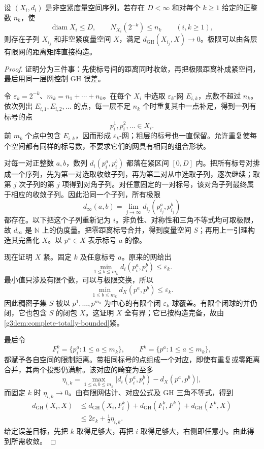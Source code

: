 \begin{proposition}\label{g3:prop:uniform-nets-subsequence}
	设 \((X_i,d_i)\) 是非空紧度量空间序列。若存在 \(D<\infty\) 和对每个 \(k\ge1\) 给定的正整数 \(n_k\)，使
	\[
		\operatorname{diam}X_i\le D,
		\qquad N_{X_i}(2^{-k})\le n_k
		\qquad(i,k\ge1),
	\]
	则存在子列 \(X_{i_j}\) 和非空紧度量空间 \(X\)，满足 \(d_{\mathrm{GH}}(X_{i_j},X)\to0\)。极限可以由各层有限网的距离矩阵直接构造。
\end{proposition}
\begin{proof}
	证明分为三件事：先使标号间的距离同时收敛，再把极限距离补成紧空间，最后用同一层网控制 GH 误差。

	令 \(\varepsilon_k=2^{-k}\)、\(m_k=n_1+\cdots+n_k\)。在每个 \(X_i\) 中选取 \(\varepsilon_k\)-网 \(E_{i,k}\)，点数不超过 \(n_k\)。依次列出 \(E_{i,1},E_{i,2},\ldots\) 的点，每一层不足 \(n_k\) 个时重复其中一点补足，得到一列有标号的点
	\[
		p_i^1,p_i^2,\ldots\in X_i.
	\]
	前 \(m_k\) 个点中包含 \(E_{i,k}\)，因而形成 \(\varepsilon_k\)-网；粗层的标号也一直保留。允许重复使每个空间都有同样的标号数，不要求它们的网具有相同的组合形状。

	对每一对正整数 \(a,b\)，数列 \(d_i(p_i^a,p_i^b)\) 都落在紧区间 \([0,D]\) 内。把所有标号对排成一个序列，先为第一对选取收敛子列，再为第二对从中选取子列，逐次继续；取第 \(j\) 次子列的第 \(j\) 项得到对角子列。对任意固定的一对标号，该对角子列最终属于相应的收敛子列。因此沿同一个子列，所有极限
	\[
		d_\infty(a,b)=\lim_{j\to\infty}
		 d_{i_j}(p_{i_j}^a,p_{i_j}^b)
	\]
	都存在。以下把这个子列重新记为 \(i\)。非负性、对称性和三角不等式均可取极限，故 \(d_\infty\) 是 \(\mathbb N\) 上的伪度量。把零距离标号合并，得到度量空间 \(S\)；再用上一引理构造其完备化 \(X\)。以 \(p^a\in X\) 表示标号 \(a\) 的像。

	现在证明 \(X\) 紧。固定 \(k\) 及任意标号 \(a\)。原来的网给出
	\[
		\min_{1\le b\le m_k}d_i(p_i^a,p_i^b)\le\varepsilon_k.
	\]
	最小值只涉及有限个数，可以与极限交换，所以
	\[
		\min_{1\le b\le m_k}d_X(p^a,p^b)\le\varepsilon_k.
	\]
	因此稠密子集 \(S\) 被以 \(p^1,\ldots,p^{m_k}\) 为中心的有限个闭 \(\varepsilon_k\)-球覆盖。有限个闭球的并仍闭，它也包含 \(S\) 的闭包 \(X\)。这证明 \(X\) 全有界；它已按构造完备，故由\cref{g3:lem:complete-totally-bounded}紧。

	最后令
	\[
		F_i^k=\{p_i^a:1\le a\le m_k\},\qquad
		F^k=\{p^a:1\le a\le m_k\},
	\]
	都赋予各自空间的限制距离。带相同标号的点组成一个对应，即使有重复或零距离合并，其两个投影仍满射。该对应的畸变为至多
	\[
		\eta_{i,k}=\max_{1\le a,b\le m_k}
		\bigl|d_i(p_i^a,p_i^b)-d_X(p^a,p^b)\bigr|,
	\]
	而固定 \(k\) 时 \(\eta_{i,k}\to0\)。由有限网估计、对应公式及 GH 三角不等式，得到
	\begin{equation}\label{g3:eq:diagonal-gh-error}
	\begin{split}
		d_{\mathrm{GH}}(X_i,X)
		&\le d_{\mathrm{GH}}(X_i,F_i^k)
		+d_{\mathrm{GH}}(F_i^k,F^k)+d_{\mathrm{GH}}(F^k,X)\\
		&\le2\varepsilon_k+\tfrac12\eta_{i,k}.
	\end{split}
	\end{equation}
	给定误差目标，先把 \(k\) 取得足够大，再把 \(i\) 取得足够大，右侧即任意小。由此得到所需收敛。
\end{proof}


